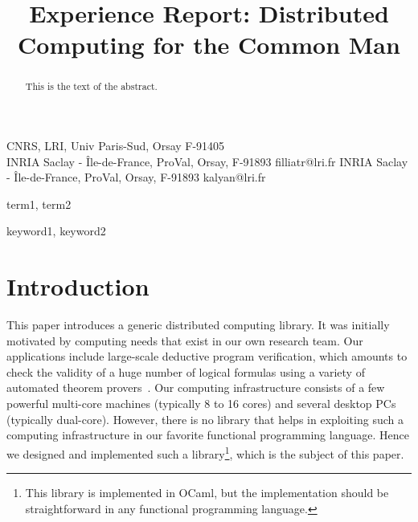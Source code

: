 \documentclass[preprint]{sigplanconf}
\newcommand{\Ocaml}{OCaml}
\begin{document}
\copyrightdata{[to be supplied]} 


\title{Experience Report: Distributed Computing for the Common Man}

           {CNRS, LRI, Univ Paris-Sud, Orsay F-91405\\
           INRIA Saclay - \^Ile-de-France, ProVal, Orsay, F-91893}
           {filliatr@lri.fr}
           {INRIA Saclay - \^Ile-de-France, ProVal, Orsay, F-91893}
           {kalyan@lri.fr}

\maketitle

\begin{abstract}
This is the text of the abstract.
\end{abstract}


\terms
term1, term2

\keywords
keyword1, keyword2

\section{Introduction}

This paper introduces a generic distributed computing library.
It was initially motivated by computing needs that exist in our own
research team. Our applications include large-scale deductive program
verification, which amounts to check the validity of a huge number of
logical formulas using a variety of automated theorem
provers~\cite{filliatre07cav}. Our computing infrastructure consists
of a few powerful multi-core machines (typically 8 to 16 cores) and
several desktop PCs (typically dual-core). However, there is no
library that helps in exploiting such a computing infrastructure in
our favorite functional programming language. Hence we designed and
implemented such a library\footnote{This library is implemented in
  \Ocaml, but the implementation should be straightforward in any
  functional programming language.}, which is the subject of this paper.
\end{document}
